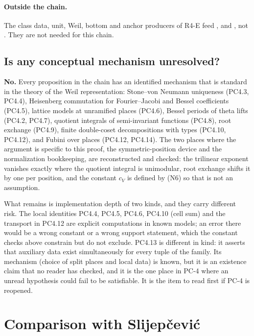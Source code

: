 \documentclass[11pt]{article}
\begin{document}
\paragraph{Outside the chain.} The class data, unit, Weil, bottom and anchor producers of R4-E feed ,  and , not . They are not needed for this chain.

\subsection{Is any conceptual mechanism unresolved?}

\textbf{No.} Every proposition in the chain has an identified mechanism that is standard in the theory of the Weil representation: Stone--von Neumann uniqueness (PC4.3, PC4.4), Heisenberg commutation for Fourier--Jacobi and Bessel coefficients (PC4.5), lattice models at unramified places (PC4.6), Bessel periods of theta lifts (PC4.2, PC4.7), quotient integrals of semi-invariant functions (PC4.8), root exchange (PC4.9), finite double-coset decompositions with types (PC4.10, PC4.12), and Fubini over places (PC4.12, PC4.14). The two places where the argument is specific to this proof, the symmetric-position device and the normalization bookkeeping, are reconstructed and checked: the trilinear exponent vanishes exactly where the quotient integral is unimodular, root exchange shifts it by one per position, and the constant $c_V$ is defined by (N6) so that  is not an assumption.

What remains is implementation depth of two kinds, and they carry different risk. The local identities PC4.4, PC4.5, PC4.6, PC4.10 (cell sum) and the transport in PC4.12 are explicit computations in known models; an error there would be a wrong constant or a wrong support statement, which the constant checks above constrain but do not exclude. PC4.13 is different in kind: it asserts that auxiliary data exist simultaneously for every tuple of the family. Its mechanism (choice of split places and local data) is known, but it is an existence claim that no reader has checked, and it is the one place in PC-4 where an unread hypothesis could fail to be satisfiable. It is the item to read first if PC-4 is reopened.

\section{Comparison with Slijepčević}\label{sec:sin}
\end{document}
